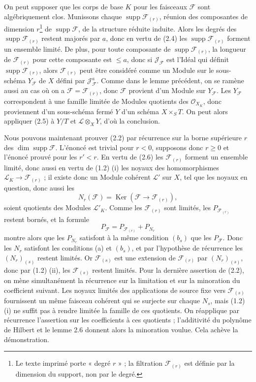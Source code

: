 On peut supposer que les corps de base $K$ pour les faisceaux $\mathcal F$ sont
algébriquement clos. Munissons chaque
$\operatorname{supp}\mathcal F_{(r)}$, réunion des composantes de dimension
$r$\footnote{Le texte imprimé porte « degré $r$ » ; la filtration
$\mathcal F_{(r)}$ est définie par la dimension du support, non par le degré.}
de $\operatorname{supp}\mathcal F$, de la structure réduite induite. Alors les
degrés des $\operatorname{supp}\mathcal F_{(r)}$ restent majorés par $a$, donc
en vertu de (2.4) les $\operatorname{supp}\mathcal F_{(r)}$ forment un ensemble
limité. De plus, pour toute composante de
$\operatorname{supp}\mathcal F_{(r)}$, la longueur de $\mathcal F_{(r)}$ pour
cette composante est $\leq a$, donc si $\mathcal J_{\mathcal F}$ est l'Idéal
qui définit $\operatorname{supp}\mathcal F_{(r)}$, alors $\mathcal F_{(r)}$
peut être considéré comme un Module sur le sous-schéma $Y_{\mathcal F}$ de $X$
défini par $\mathcal J_{\mathcal F}^{a}$. Comme dans le lemme précédent, on se
ramène aussi au cas où on a $\mathcal F=\mathcal F_{(r)}$, donc $\mathcal F$
provient d'un Module sur $Y_{\mathcal F}$. Les $Y_{\mathcal F}$ correspondent à
une famille limitée de Modules quotients des $\mathcal O_{X_K}$, donc
proviennent d'un sous-schéma fermé $Y$ d'un schéma $X\times_S T$. On peut alors
appliquer (2.5) à $Y/T$ et $\mathcal L\otimes_XY$, d'où la conclusion.

Nous pouvons maintenant prouver (2.2) par récurrence sur la borne supérieure
$r$ des $\dim\operatorname{supp}\mathcal F$. L'énoncé est trivial pour $r<0$,
supposons donc $r\geq0$ et l'énoncé prouvé pour les $r'<r$. En vertu de (2.6)
les $\mathcal F_{(r)}$ forment un ensemble limité, donc aussi en vertu de (1.2)
(i) les noyaux des homomorphismes
$\mathcal L_K\longrightarrow\mathcal F_{(r)}$ ; il existe donc un Module
cohérent $\mathcal L'$ sur $X$, tel que les noyaux en question, donc aussi les
\[
N_r(\mathcal F)=\operatorname{Ker}(\mathcal F\longrightarrow\mathcal F_{(r)}),
\]
soient quotients des Modules $\mathcal L'_K$. Comme les $\mathcal F_{(r)}$ sont
limités, les $P_{\mathcal F_{(r)}}$ restent bornés, et la formule
\[
P_{\mathcal F}=P_{\mathcal F_{(r)}}+P_{N_r}
\]
montre alors que les $P_{N_r}$ satisfont à la même condition $(b_s)$ que les
$P_{\mathcal F}$. Donc les $N_r$ satisfont les conditions (a) et $(b_s)$, et
par l'hypothèse de récurrence les $(N_r)_{(s)}$ restent limités. Or
$\mathcal F_{(s)}$ est une extension de $\mathcal F_{(r)}$ par
$(N_r)_{(s)}$, donc par (1.2) (ii), les $\mathcal F_{(s)}$ restent limités.
Pour la dernière assertion de (2.2), on mène simultanément la récurrence sur la limitation et sur la minoration du coefficient suivant. Les noyaux limités des applications de source fixe vers $\mathcal F_{(s)}$ fournissent un même faisceau cohérent qui se surjecte sur chaque $N_s$, mais (1.2) (i) ne suffit pas à rendre limitée la famille de ces quotients. On réapplique par récurrence l'assertion sur les coefficients à ces quotients ; l'additivité du polynôme de Hilbert et le lemme 2.6 donnent alors la minoration voulue.
Cela achève la démonstration.

